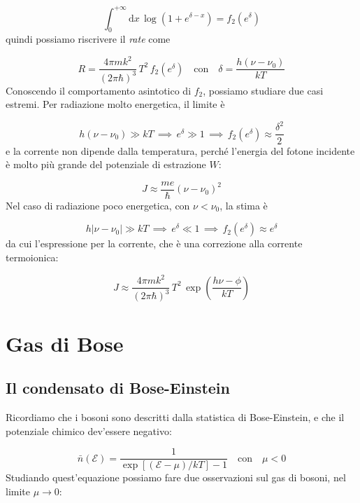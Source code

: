 \documentclass[a4paper]{report}
\begin{document}
\begin{equation}
    \int_{0}^{+\infty}\mathrm{d}x\,\log \left(1+e^{\delta - x}\right) = f_2(e^\delta)
\end{equation}
quindi possiamo riscrivere il \textit{rate} come

\begin{equation}
    R = \frac{4\pi m k^2}{(2\pi\hbar)^3}\, T^2 \, f_2(e^\delta) \quad \text{con}\quad \delta = \frac{h(\nu-\nu_0)}{k T}
\end{equation}
Conoscendo il comportamento asintotico di $f_2$, possiamo studiare due casi estremi. Per radiazione molto energetica, il limite è

\begin{equation}
    h(\nu-\nu_0) \gg k T \,\implies\, e^\delta \gg 1 \,\implies\, f_2(e^\delta) \approx \frac{\delta^2}{2}
\end{equation}
e la corrente non dipende dalla temperatura, perché l'energia del fotone incidente è molto più grande del potenziale di estrazione $W$:

\begin{equation}
    J \approx \frac{m e}{\hbar}(\nu-\nu_0)^2
\end{equation}
Nel caso di radiazione poco energetica, con $\nu < \nu_0$, la stima è

\begin{equation}
    h|\nu-\nu_0| \gg k T \,\implies\, e^\delta \ll 1 \,\implies\, f_2(e^\delta) \approx e^\delta
\end{equation}
da cui l'espressione per la corrente, che è una correzione alla corrente termoionica:

\begin{equation}
    J \approx \frac{4\pi m k^2}{(2\pi\hbar)^3}\, T^2 \, \exp\left(\frac{h\nu-\phi}{k T}\right)
\end{equation}

\section{Gas di Bose}

\subsection{Il condensato di Bose-Einstein}

Ricordiamo che i bosoni sono descritti dalla statistica di Bose-Einstein, e che il potenziale chimico dev'essere negativo:

\begin{equation}
    \bar{n}(\mathcal{E}) = \frac{1}{\exp [(\mathcal{E}-\mu)/ k T] -1} \quad \text{con} \quad \mu < 0
\end{equation}
Studiando quest'equazione possiamo fare due osservazioni sul gas di bosoni, nel limite $\mu \to 0$:
\end{document}
